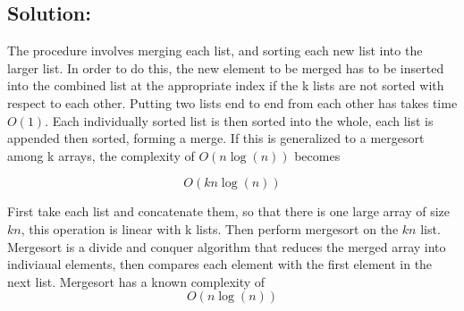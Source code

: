 \documentclass[12pt]{article}
\begin{document}
    \subsection{Solution:}
      
      The procedure involves merging each list, and sorting each new list into the larger list. In order to do this, the new element to be merged has to be inserted into the combined list at the appropriate index if the k lists are not sorted with respect to each other. Putting two lists end to end from each other has takes time $O(1)$. Each individually sorted list is then sorted into the whole, each list is appended then sorted, forming a merge. If this is generalized to a mergesort among k arrays, the complexity of $O(n\log(n))$ becomes 

      $$O(kn\log(n))$$
      
      First take each list and concatenate them, so that there is one large array of size $kn$, this operation is linear with k lists. Then perform mergesort on the $kn$ list. Mergesort is a divide and conquer algorithm that reduces the merged array into indiviaual elements, then compares each element with the first element in the next list. Mergesort has a known complexity of 
      $$O(n\log(n))$$
\end{document}
